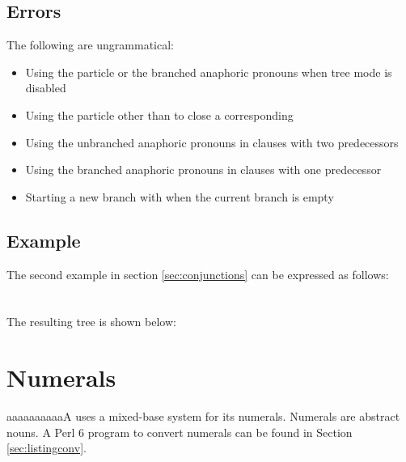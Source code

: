 \documentclass{book}
\newcommand{\lname}{aaaaaaaaaaA}
\begin{document}
\section{Errors}

The following are ungrammatical:

\begin{itemize}
    \item Using the particle  or the branched anaphoric pronouns when tree mode is disabled
    \item Using the particle  other than to close a corresponding 
    \item Using the unbranched anaphoric pronouns in clauses with two predecessors
    \item Using the branched anaphoric pronouns in clauses with one predecessor
    \item Starting a new branch with  when the current branch is empty
\end{itemize}

\section{Example}

The second example in section \ref{sec:conjunctions} can be expressed as follows: \\
~\\
 \\

The resulting tree is shown below:

\begin{center}
\end{center}

\chapter{Numerals}

\lname{} uses a mixed-base system for its numerals. Numerals are abstract nouns. A Perl 6 program to convert numerals can be found in Section \ref{sec:listingconv}.
\end{document}
